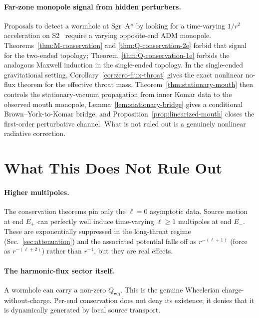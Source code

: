 \documentclass[aps,prd,onecolumn,nofootinbib,superscriptaddress]{revtex4-2}
\begin{document}
\paragraph{Far-zone monopole signal from hidden perturbers.}
Proposals to detect a wormhole at Sgr~A* by looking for a time-varying $1/r^2$
acceleration on S2~\cite{DaiStojkovic2019Observing,SimonettiEtAl2021SensitiveSearches}
require a varying opposite-end ADM monopole.  Theorems~\ref{thm:M-conservation}
and \ref{thm:Q-conservation-2e} forbid that signal for the two-ended topology;
Theorem~\ref{thm:Q-conservation-1e} forbids the analogous Maxwell induction in
the single-ended topology.  In the single-ended gravitational setting,
Corollary~\ref{cor:zero-flux-throat} gives the exact nonlinear no-flux theorem
for the effective throat mass.  Theorem~\ref{thm:stationary-mouth} then
controls the stationary-vacuum propagation from inner Komar data to the
observed mouth monopole, Lemma~\ref{lem:stationary-bridge} gives a conditional
Brown--York-to-Komar bridge, and Proposition~\ref{prop:linearized-mouth} closes
the first-order perturbative channel.  What is not ruled out is a genuinely
nonlinear radiative correction.

\section{What This Does Not Rule Out}
\label{sec:not-ruled-out}

\paragraph{Higher multipoles.}
The conservation theorems pin only the $\ell=0$ asymptotic data.  Source motion
at end $E_+$ can perfectly well induce time-varying $\ell\ge 1$ multipoles at
end $E_-$.  These are exponentially suppressed in the long-throat regime
(Sec.~\ref{sec:attenuation}) and the associated potential falls off as
$r^{-(\ell+1)}$ (force as $r^{-(\ell+2)}$) rather than $r^{-1}$, but they
are real effects.

\paragraph{The harmonic-flux sector itself.}
A wormhole can carry a non-zero $Q_{\mathrm{wh}}$.  This is the genuine
Wheelerian charge-without-charge.  Per-end conservation does not deny its
existence; it denies that it is dynamically generated by local source transport.
\end{document}
